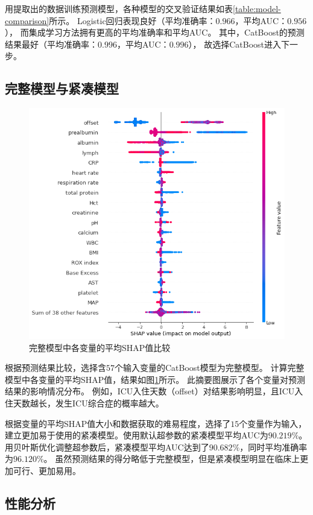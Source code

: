 用提取出的数据训练预测模型，各种模型的交叉验证结果如表\ref{table:model-comparison}所示。%
Logistic回归表现良好（平均准确率：$0.966$，平均AUC：$0.956$），%
而集成学习方法拥有更高的平均准确率和平均AUC。%
其中，CatBoost的预测结果最好（平均准确率：$0.996$，平均AUC：$0.996$），%
故选择CatBoost进入下一步。

\subsection{完整模型与紧凑模型}

\begin{figure}[htb]
    \centering
    \includegraphics[width=0.9\linewidth]{../img/eicu_full_shap_beeswarm_20.png}
    \caption{完整模型中各变量的平均SHAP值比较}
    \label{figure:full-shap}
\end{figure}

根据预测结果比较，选择含$57$个输入变量的CatBoost模型为完整模型。%
计算完整模型中各变量的平均SHAP值，结果如图\ref{figure:full-shap}所示。%
此摘要图展示了各个变量对预测结果的影响情况分布。%
例如，ICU入住天数（offset）对结果影响明显，且ICU入住天数越长，发生ICU综合症的概率越大。

根据变量的平均SHAP值大小和数据获取的难易程度，选择了$15$个变量作为输入，%
建立更加易于使用的紧凑模型。使用默认超参数的紧凑模型平均AUC为$90.219\%$。%
用贝叶斯优化调整超参数后，紧凑模型平均AUC达到了$90.682\%$，同时平均准确率为$96.120\%$。%
虽然预测结果的得分略低于完整模型，但是紧凑模型明显在临床上更加可行、更加易用。

\subsection{性能分析}

